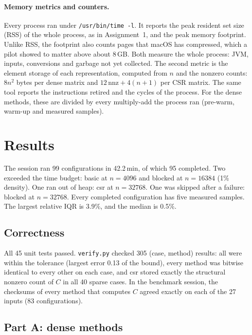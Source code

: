 \documentclass[11pt,a4paper]{article}
\begin{document}
\paragraph{Memory metrics and counters.} Every process ran under
\texttt{/usr/bin/time -l}. It reports the peak resident set size (RSS) of the
whole process, as in Assignment~1, and the peak memory footprint. Unlike RSS,
the footprint also counts pages that macOS has compressed, which a pilot showed
to matter above about 8\,GB. Both measure the whole process: JVM, inputs,
conversions and garbage not yet collected. The second metric is the element
storage of each representation, computed from $n$ and the nonzero counts:
$8n^2$ bytes per dense matrix and $12\,\mathrm{nnz}+4(n+1)$ per CSR matrix. The
same tool reports the instructions retired and the cycles of the process. For
the dense methods, these are divided by every multiply-add the process ran
(pre-warm, warm-up and measured samples).

\section{Results}
\label{sec:results}

The session ran 99 configurations in 42.2\,min, of which 95 completed. Two exceeded the
time budget: basic at $n=4096$ and blocked at $n=16384$ (1\% density). One ran
out of heap: csr at $n=32768$. One was skipped after a failure: blocked at
$n=32768$. Every completed configuration has five measured samples. The largest
relative IQR is 3.9\%, and the median is 0.5\%.

\subsection{Correctness}

All 45 unit tests passed. \texttt{verify.py} checked 305 (case, method) results:
all were within the tolerance (largest error 0.13 of the bound), every method
was bitwise identical to every other on each case, and csr stored exactly the
structural nonzero count of $C$ in all 40 sparse cases. In the benchmark session,
the checksums of every method that computes $C$ agreed exactly on each of the 27
inputs (83 configurations).

\subsection{Part A: dense methods}
\end{document}
